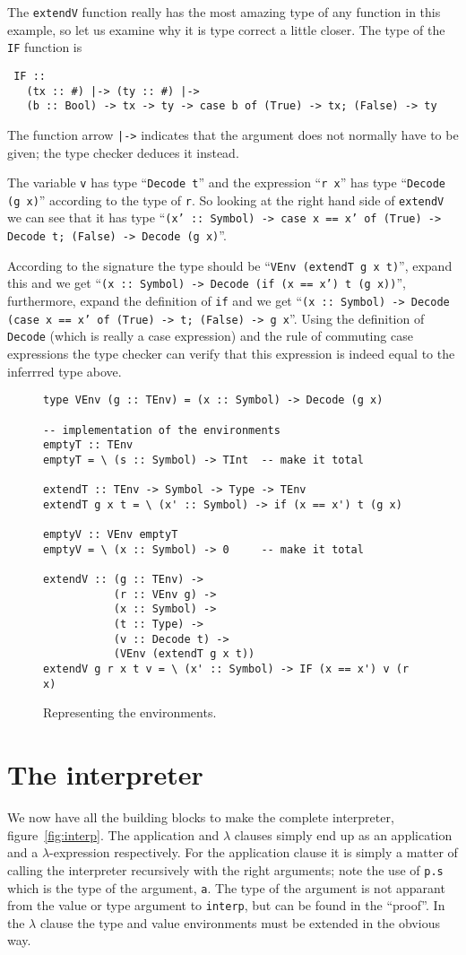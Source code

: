 \documentclass{llncs}[12pt]             %
\newcommand{\te}[1]{{\tt #1}}
\begin{document}
The \te{extendV} function really has the most amazing type of any
function in this example, so let us examine why it is type correct
a little closer.  The type of the \te{IF} function is
\begin{verbatim}
 IF ::
   (tx :: #) |-> (ty :: #) |-> 
   (b :: Bool) -> tx -> ty -> case b of (True) -> tx; (False) -> ty
\end{verbatim}

The function arrow \te{|->} indicates that the argument does not
normally have to be given; the type checker deduces it instead.

The variable \te{v} has type ``\te{Decode t}'' and the expression
``\te{r x}'' has type ``\te{Decode (g x)}'' according to the type
of \te{r}.
So looking at the right hand side of \te{extendV} we can see that it has
type ``\te{(x' :: Symbol) -> case x == x' of (True) -> Decode t; (False) -> Decode (g x)}''.

According to the signature the type should be
``\te{VEnv (extendT g x t)}'', expand this and we get
``\te{(x :: Symbol) -> Decode (if (x == x') t (g x))}'', furthermore, 
expand the definition of \te{if} and we get
``\te{(x :: Symbol) -> Decode (case x == x' of (True) -> t; (False) -> g x}''.
Using the definition of \te{Decode} (which is really a case expression)
and the rule of commuting case expressions the type checker can verify that
this expression is indeed equal to the inferrred type above.

\begin{figure}
\begin{verbatim}
type VEnv (g :: TEnv) = (x :: Symbol) -> Decode (g x)

-- implementation of the environments
emptyT :: TEnv
emptyT = \ (s :: Symbol) -> TInt  -- make it total

extendT :: TEnv -> Symbol -> Type -> TEnv
extendT g x t = \ (x' :: Symbol) -> if (x == x') t (g x)

emptyV :: VEnv emptyT
emptyV = \ (x :: Symbol) -> 0     -- make it total

extendV :: (g :: TEnv) ->
           (r :: VEnv g) ->
           (x :: Symbol) ->
           (t :: Type) ->
           (v :: Decode t) ->
           (VEnv (extendT g x t))
extendV g r x t v = \ (x' :: Symbol) -> IF (x == x') v (r x)
\end{verbatim}
\caption{Representing the environments.}
\label{fig:env}
\end{figure}

\section{The interpreter}
We now have all the building blocks to make the complete interpreter,
figure~\ref{fig:interp}.  The application and $\lambda$ clauses simply
end up as an application and a $\lambda$-expression respectively.
For the application clause it is simply a matter of calling the
interpreter recursively with the right arguments; note the use of
\te{p.s} which is the type of the argument, \te{a}.  The type
of the argument is not apparant from the value or type argument to
\te{interp}, but can be found in the ``proof''.  In the $\lambda$ clause
the type and value environments must be extended in the obvious way.
\end{document}

